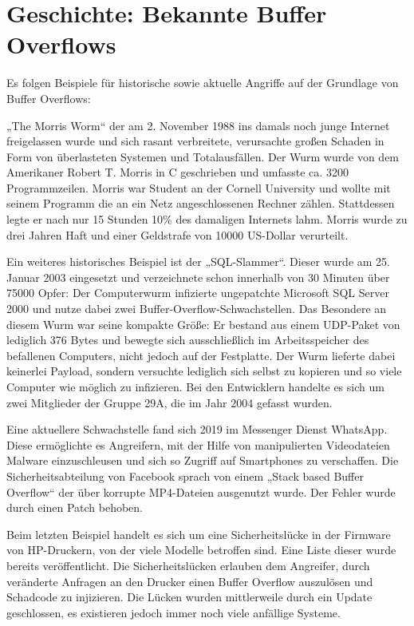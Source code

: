 \section{Geschichte: Bekannte Buffer Overflows} \label{sec:wellknown}
Es folgen Beispiele für historische sowie aktuelle Angriffe auf der Grundlage von Buffer Overflows:

„The Morris Worm“ der am 2. November 1988 ins damals noch junge Internet freigelassen wurde und sich rasant verbreitete,
verursachte großen Schaden in Form von überlasteten Systemen und Totalausfällen. Der Wurm wurde von dem Amerikaner Robert T. Morris in C geschrieben
und umfasste ca. 3200 Programmzeilen. Morris war Student an der Cornell University und wollte mit seinem Programm die an ein Netz angeschlossenen Rechner zählen.
Stattdessen legte er nach nur 15 Stunden 10\% des damaligen Internets lahm. Morris wurde zu drei Jahren Haft und einer Geldstrafe von 10000 US-Dollar verurteilt. \cite{wiki1}

Ein weiteres historisches Beispiel ist der „SQL-Slammer“. Dieser wurde am 25. Januar 2003 eingesetzt und verzeichnete schon innerhalb von 30 Minuten über 75000 Opfer:
Der Computerwurm infizierte ungepatchte Microsoft SQL Server 2000 und nutze dabei zwei Buffer-Overflow-Schwachstellen.
Das Besondere an diesem Wurm war seine kompakte Größe: Er bestand aus einem UDP-Paket von lediglich 376 Bytes und bewegte sich ausschließlich im Arbeitsspeicher des befallenen
Computers, nicht jedoch auf der Festplatte. Der Wurm lieferte dabei keinerlei Payload, sondern versuchte lediglich sich selbst zu kopieren und
so viele Computer wie möglich zu infizieren. Bei den Entwicklern handelte es sich um zwei Mitglieder der Gruppe 29A, die im Jahr 2004 gefasst wurden. \cite{wiki2}

Eine aktuellere Schwachstelle fand sich 2019 im Messenger Dienst WhatsApp. Diese ermöglichte es Angreifern,
mit der Hilfe von manipulierten Videodateien Malware einzuschleusen und sich so Zugriff auf Smartphones zu verschaffen.
Die Sicherheitsabteilung von Facebook sprach von einem „Stack based Buffer Overflow“ der über korrupte MP4-Dateien ausgenutzt wurde.
Der Fehler wurde durch einen Patch behoben. \cite{whatsapp1}

Beim letzten Beispiel handelt es sich um eine Sicherheitslücke in der Firmware von HP-Druckern, von der viele Modelle betroffen sind.
Eine Liste dieser wurde bereits veröffentlicht. Die Sicherheitslücken erlauben dem Angreifer, durch veränderte Anfragen an den Drucker einen Buffer Overflow auszulösen
und Schadcode zu injizieren. Die Lücken wurden mittlerweile durch ein Update geschlossen, es existieren jedoch immer noch viele anfällige Systeme. \cite{hpvuln}
